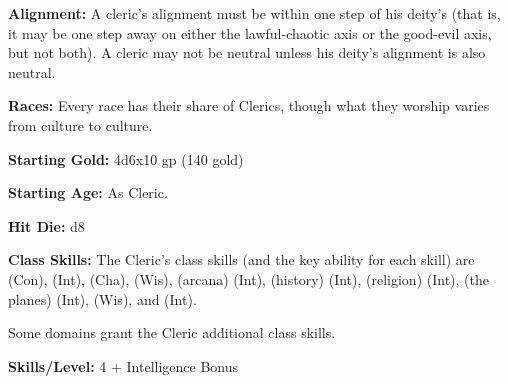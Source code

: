 
\textbf{Alignment:} A cleric's alignment must be within one step of his deity's (that is, it may be one step away on either the lawful-chaotic axis or the good-evil axis, but not both). A cleric may not be neutral unless his deity's alignment is also neutral.

\textbf{Races:} Every race has their share of Clerics, though what they worship varies from culture to culture.

\textbf{Starting Gold:} 4d6x10 gp (140 gold)

\textbf{Starting Age:} As Cleric.

\textbf{Hit Die:} d8

\textbf{Class Skills:} The Cleric's class skills (and the key ability for each skill) are  (Con),  (Int),  (Cha),  (Wis),  (arcana) (Int),  (history) (Int),  (religion) (Int),  (the planes) (Int),  (Wis), and  (Int).

Some domains grant the Cleric additional class skills.

\textbf{Skills/Level:} 4 + Intelligence Bonus

\modebab{}
\goodfor{}
\poorref{}
\goodwil{}

\begin{fullcastingclasstable}
\end{fullcastingclasstable}

